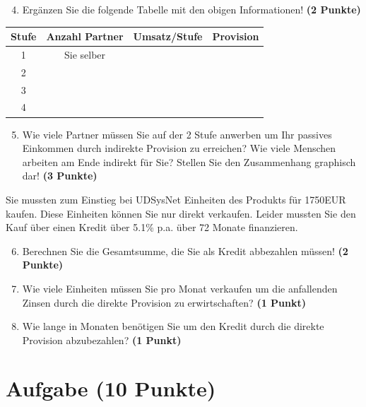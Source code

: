 \documentclass[a4paper, 9pt]{scrartcl}\usepackage[]{graphicx}\usepackage[]{xcolor}
\begin{document}
\begin{enumerate}
  \setcounter{enumi}{3}
\item Erg{\"a}nzen Sie die folgende Tabelle mit den obigen Informationen! \textbf{(2 Punkte)}
\end{enumerate}

\begin{center}
\begin{tabular}{c|c|c|c}
  \toprule
  \textbf{Stufe} & \textbf{Anzahl Partner}  & \textbf{Umsatz/Stufe} & \textbf{Provision}\\
  \midrule
  1 & Sie selber  &  & \\ \midrule
  2 &   &  &  \\ \midrule
  3 &   &  &  \\ \midrule
  4 &   &  &  \\
  \bottomrule
\end{tabular}
\end{center}

\begin{enumerate}
  \setcounter{enumi}{4}
\item Wie viele Partner m{\"u}ssen Sie auf der 2 Stufe anwerben um Ihr passives
  Einkommen durch indirekte Provision zu erreichen? Wie viele Menschen
  arbeiten am Ende indirekt f{\"u}r Sie? Stellen Sie den
  Zusammenhang graphisch dar!  \textbf{(3 Punkte)}
\end{enumerate}

Sie mussten zum Einstieg bei UDSysNet Einheiten des Produkts
f{\"u}r 1750EUR kaufen. Diese Einheiten k{\"o}nnen Sie nur direkt
verkaufen. Leider mussten Sie den Kauf {\"u}ber einen Kredit {\"u}ber
5.1\% p.a. {\"u}ber 72 Monate finanzieren.

\begin{enumerate}
  \setcounter{enumi}{5}
\item Berechnen Sie die Gesamtsumme, die Sie als Kredit abbezahlen m{\"u}ssen! \textbf{(2 Punkte)}
\item Wie viele Einheiten m{\"u}ssen Sie pro Monat verkaufen um die anfallenden Zinsen
  durch die direkte Provision zu erwirtschaften? \textbf{(1 Punkt)}
\item Wie lange in
  Monaten ben{\"o}tigen Sie um den Kredit durch die direkte
  Provision abzubezahlen? \textbf{(1 Punkt)}
\end{enumerate} 
\clearpage

\section{Aufgabe \hfill (10 Punkte)}
\end{document}
